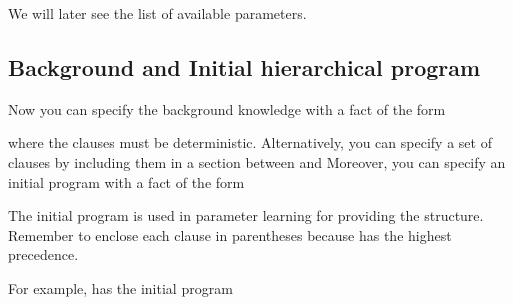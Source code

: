 \documentclass[letterpaper,10pt,english]{sphinxmanual}
\begin{document}
We will later see the list of available parameters.


\subsection{Background and Initial hierarchical program}
\label{\detokenize{index:background-and-initial-hierarchical-program}}
Now you can specify the background knowledge with a fact of the form

%
\begin{sphinxVerbatim}[commandchars=\\\{\}]
    
\end{sphinxVerbatim}

where the clauses must be deterministic.
Alternatively, you can specify a set of clauses by including them in a section between  and 
Moreover, you can specify an initial program with a fact of the form

%
\begin{sphinxVerbatim}[commandchars=\\\{\}]
    
\end{sphinxVerbatim}

The initial program is used in parameter learning for providing the structure.
Remember to enclose each clause in parentheses because \sphinxcode{:-} has the highest precedence.

For example,  has the initial program

%
\begin{sphinxVerbatim}[commandchars=\\\{\}]
\PYG{p}{[} 
 
 
   \PYG{p}{]}
\end{sphinxVerbatim}
\end{document}
